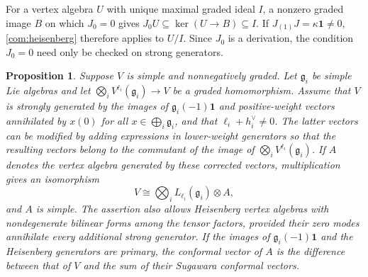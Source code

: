 \documentclass[11pt,a4paper]{amsart}
\numberwithin{equation}{section}
\newtheorem{proposition}[theorem]{Proposition}
\theoremstyle{definition}
\theoremstyle{remark}
\newcommand{\g}{\mathfrak g}
\begin{document}
For a vertex algebra $U$ with unique maximal graded ideal $I$, a nonzero
graded image $B$ on which $J_0=0$ gives
$J_0U\subseteq\ker(U\to B)\subseteq I$.
If $J_{(1)}J=\kappa\mathbf1\ne0$, \cref{com:heisenberg} therefore
applies to $U/I$. Since $J_0$ is a derivation, the condition $J_0=0$ need only
be checked on strong generators.

\begin{proposition}\label{com:neutral-split}
Suppose $V$ is simple and nonnegatively graded. Let $\g_i$ be
simple Lie algebras and let
$\bigotimes_i V^{\ell_i}(\g_i)\to V$ be a graded homomorphism.
Assume that $V$ is strongly generated by the images of
$\g_i(-1)\mathbf1$ and positive-weight vectors annihilated by
$x(0)$ for all $x\in\bigoplus_i\g_i$, and that
$\ell_i+h_i^\vee\ne0$. The latter vectors can be modified by adding expressions in
lower-weight generators so that the resulting vectors belong to the commutant
of the image of $\bigotimes_i V^{\ell_i}(\g_i)$. If $A$ denotes
the vertex algebra generated by these corrected vectors, multiplication
gives an isomorphism
\begin{equation}\label{com:neutral-tensor}
           V\cong\bigotimes_i L_{\ell_i}(\g_i)\otimes A,
\end{equation}
and $A$ is simple. The assertion also allows Heisenberg vertex
algebras with nondegenerate bilinear forms among the tensor factors,
provided their zero modes annihilate every additional strong generator.
If the images of $\g_i(-1)\mathbf1$ and the Heisenberg generators
are primary, the conformal vector of $A$ is the difference between
that of $V$ and the sum of their Sugawara conformal vectors.
\end{proposition}
\end{document}
